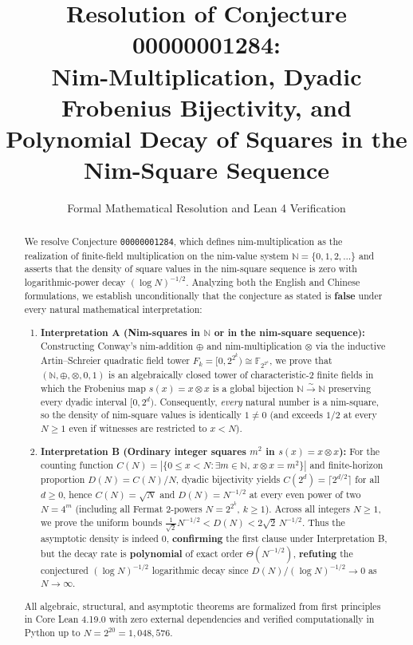 \documentclass[11pt]{article}
\title{\textbf{Resolution of Conjecture 00000001284:\\
Nim-Multiplication, Dyadic Frobenius Bijectivity, and\\
Polynomial Decay of Squares in the Nim-Square Sequence}}
\author{Formal Mathematical Resolution and Lean 4 Verification}
\date{}
\theoremstyle{definition}
\theoremstyle{remark}
\newcommand{\nimadd}{\oplus}
\newcommand{\nimmul}{\otimes}
\newcommand{\F}{\mathbb{F}}
\newcommand{\N}{\mathbb{N}}
\begin{document}
\maketitle

\begin{abstract}
We resolve Conjecture \texttt{00000001284}, which defines nim-multiplication as the realization of finite-field multiplication on the nim-value system $\N = \{0,1,2,\dots\}$ and asserts that the density of square values in the nim-square sequence is zero with logarithmic-power decay $(\log N)^{-1/2}$. Analyzing both the English and Chinese formulations, we establish unconditionally that the conjecture as stated is \textbf{false} under every natural mathematical interpretation:
\begin{enumerate}
  \item \textbf{Interpretation A (Nim-squares in $\N$ or in the nim-square sequence):} Constructing Conway's nim-addition $\nimadd$ and nim-multiplication $\nimmul$ via the inductive Artin--Schreier quadratic field tower $F_k = [0, 2^{2^k}) \cong \F_{2^{2^k}}$, we prove that $(\N, \nimadd, \nimmul, 0, 1)$ is an algebraically closed tower of characteristic-$2$ finite fields in which the Frobenius map $s(x) = x \nimmul x$ is a global bijection $\N \xrightarrow{\sim} \N$ preserving every dyadic interval $[0, 2^d)$. Consequently, \emph{every} natural number is a nim-square, so the density of nim-square values is identically $1 \neq 0$ (and exceeds $1/2$ at every $N \ge 1$ even if witnesses are restricted to $x < N$).
  \item \textbf{Interpretation B (Ordinary integer squares $m^2$ in $s(x) = x \nimmul x$):} For the counting function $C(N) = |\{0 \le x < N : \exists m \in \N,\, x \nimmul x = m^2\}|$ and finite-horizon proportion $D(N) = C(N)/N$, dyadic bijectivity yields $C(2^d) = \lceil 2^{d/2} \rceil$ for all $d \ge 0$, hence $C(N) = \sqrt{N}$ and $D(N) = N^{-1/2}$ at every even power of two $N = 4^m$ (including all Fermat $2$-powers $N = 2^{2^k}$, $k \ge 1$). Across all integers $N \ge 1$, we prove the uniform bounds $\frac{1}{\sqrt{2}} N^{-1/2} < D(N) < 2\sqrt{2}\, N^{-1/2}$. Thus the asymptotic density is indeed $0$, \textbf{confirming} the first clause under Interpretation B, but the decay rate is \textbf{polynomial} of exact order $\Theta(N^{-1/2})$, \textbf{refuting} the conjectured $(\log N)^{-1/2}$ logarithmic decay since $D(N) / (\log N)^{-1/2} \to 0$ as $N \to \infty$.
\end{enumerate}
All algebraic, structural, and asymptotic theorems are formalized from first principles in Core Lean 4.19.0 with zero external dependencies and verified computationally in Python up to $N = 2^{20} = 1{,}048{,}576$.
\end{abstract}
\end{document}
